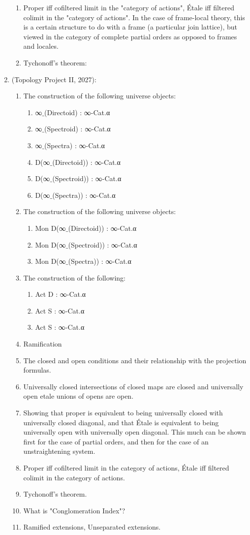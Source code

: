 \documentclass{book}
\begin{document}
\begin{enumerate}
\begin{enumerate}
\item Proper iff cofiltered limit in the "category of actions", Étale iff filtered colimit in the "category of actions". In the case of frame-local theory, this is a certain structure to do with a frame (a particular join lattice), but viewed in the category of complete partial orders as opposed to frames and locales.
\item Tychonoff's theorem: 
\end{enumerate}
\item (Topology Project II, 2027):
\begin{enumerate}
\item The construction of the following universe objects:
\begin{enumerate}
\item ∞${}\_$(Directoid) : ∞-Cat.α
\item ∞${}\_$(Spectroid) : ∞-Cat.α
\item ∞${}\_$(Spectra) : ∞-Cat.α
\item D(∞${}\_$(Directoid)) : ∞-Cat.α
\item D(∞${}\_$(Spectroid)) : ∞-Cat.α
\item D(∞${}\_$(Spectra)) : ∞-Cat.α
\end{enumerate}
\item The construction of the following universe objects:
\begin{enumerate}
\item Mon D(∞${}\_$(Directoid)) : ∞-Cat.α
\item Mon D(∞${}\_$(Spectroid)) : ∞-Cat.α
\item Mon D(∞${}\_$(Spectra)) : ∞-Cat.α
\end{enumerate}
\item The construction of the following:
\begin{enumerate}
\item Act D : ∞-Cat.α 
\item Act S : ∞-Cat.α
\item Act S : ∞-Cat.α
\end{enumerate}
\item Ramification 
\item The closed and open conditions and their relationship with the projection formulas.
\item Universally closed intersections of closed maps are closed and universally open etale unions of opens are open.
\item Showing that proper is equivalent to being universally closed with universally closed diagonal, and that Étale is equivalent to being universally open with universally open diagonal. This much can be shown first for the case of partial orders, and then for the case of an unstraightening system.
\item Proper iff cofiltered limit in the category of actions, Étale iff filtered colimit in the category of actions.
\item Tychonoff's theorem.
\item What is "Conglomeration Index"?
\item Ramified extensions, Unseparated extensions.
\end{enumerate}
\end{enumerate}
\end{document}
